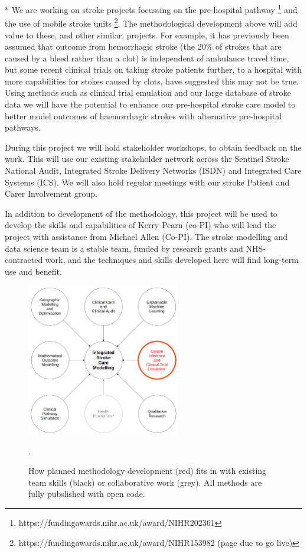 * We are working on stroke projects focussing on the pre-hospital pathway \footnote{https://fundingawards.nihr.ac.uk/award/NIHR202361} and the use of mobile stroke units \footnote{https://fundingawards.nihr.ac.uk/award/NIHR153982 (page due to go live)}. The methodological development above will add value to these, and other similar, projects. For example, it has previously been assumed that outcome from hemorrhagic stroke (the 20\% of strokes that are caused by a bleed rather than a clot) is independent of ambulance travel time, but some recent clinical trials on taking stroke patients further, to a hospital with more capabilities for stokes caused by clots, have suggested this may not be true. Using methods such as clinical trial emulation and our large database of stroke data we will have the potential to enhance our pre-hospital stroke care model to better model outcomes of haemorrhagic strokes with alternative pre-hospital pathways.

During this project we will hold stakeholder workshops, to obtain feedback on the work. This will use our existing stakeholder network across thr Sentinel Stroke National Audit, Integrated Stroke Delivery Networks (ISDN) and Integrated Care Systems (ICS). We will also hold regular meetings with our stroke Patient and Carer Involvement group.

In addition to development of the methodology, this project will be used to develop the skills and capabilities of Kerry Pearn (co-PI) who will lead the project with assistance from Michael Allen (Co-PI). The stroke modelling and data science team is a stable team, funded by research grants and NHS-contracted work, and the techniques and skills developed here will find long-term use and benefit.


\begin{figure}[htbp]
\centering
\includegraphics[width=0.6\textwidth]{./images/expertise}
\caption{How planned methodology development (red) fits in with existing team skills (black) or collaborative work (grey). All methods are fully pubslished with open code.}.
\label{fig:expertise}
\end{figure}

